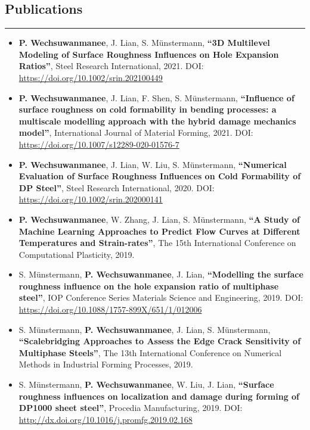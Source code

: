 \subsection*{Publications}
\hrule
\vspace*{0.2cm}
\begin{itemize}
    \item
    \textbf{P. Wechsuwanmanee}, J. Lian, S. Münstermann, \textbf{``3D Multilevel Modeling of Surface Roughness Influences on Hole Expansion Ratios''}, Steel Research International, 2021. DOI: \url{https://doi.org/10.1002/srin.202100449}
    
    \item
    \textbf{P. Wechsuwanmanee}, J. Lian, F. Shen, S. Münstermann, \textbf{``Influence of surface roughness on cold formability in bending processes: a multiscale modelling approach with the hybrid damage mechanics model''}, International Journal of Material Forming, 2021. DOI: \url{https://doi.org/10.1007/s12289-020-01576-7}
    
    \item
    \textbf{P. Wechsuwanmanee}, J. Lian, W. Liu, S. Münstermann, \textbf{``Numerical Evaluation of Surface Roughness Influences on Cold Formability of DP Steel''}, Steel Research International, 2020. DOI: \url{https://doi.org/10.1002/srin.202000141}
    
    \item
    \textbf{P. Wechsuwanmanee}, W. Zhang, J. Lian, S. Münstermann, \textbf{``A Study of Machine Learning Approaches to Predict Flow Curves at Different Temperatures and Strain-rates''}, The 15th International Conference on Computational Plasticity, 2019. 
    
    \item
    S. Münstermann, \textbf{P. Wechsuwanmanee}, J. Lian, \textbf{``Modelling the surface roughness influence on the hole expansion ratio of multiphase steel''}, IOP Conference Series Materials Science and Engineering, 2019. DOI: \url{https://doi.org/10.1088/1757-899X/651/1/012006}
    
    \item
    S. Münstermann, \textbf{P. Wechsuwanmanee}, J. Lian, S. Münstermann, \textbf{``Scalebridging Approaches to Assess the Edge Crack Sensitivity of Multiphase Steels''}, The 13th International Conference on Numerical Methods in Industrial Forming Processes, 2019.
    
    \item
    S. Münstermann, \textbf{P. Wechsuwanmanee}, W. Liu, J. Lian, \textbf{``Surface roughness influences on localization and damage during forming of DP1000 sheet steel''}, Procedia Manufacturing, 2019. DOI: \url{http://dx.doi.org/10.1016/j.promfg.2019.02.168}
    

\end{itemize}
